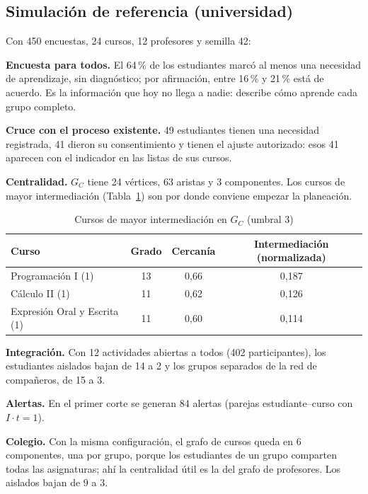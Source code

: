 \documentclass[12pt,letterpaper]{article}
\begin{document}
\subsection{Simulación de referencia (universidad)}
Con 450 encuestas, 24 cursos, 12 profesores y semilla 42:

\textbf{Encuesta para todos.} El 64\,\% de los estudiantes marcó al menos una necesidad de aprendizaje, sin diagnóstico; por afirmación, entre 16\,\% y 21\,\% está de acuerdo. Es la información que hoy no llega a nadie: describe cómo aprende cada grupo completo.

\textbf{Cruce con el proceso existente.} 49 estudiantes tienen una necesidad registrada, 41 dieron su consentimiento y tienen el ajuste autorizado: esos 41 aparecen con el indicador en las listas de sus cursos.

\textbf{Centralidad.} $G_C$ tiene 24 vértices, 63 aristas y 3 componentes. Los cursos de mayor intermediación (Tabla~\ref{tab:central}) son por donde conviene empezar la planeación.

\begin{table}[H]
\centering
\caption{Cursos de mayor intermediación en $G_C$ (umbral 3)}
\label{tab:central}
\small
\begin{tabular}{lccc}
\toprule
Curso & Grado & Cercanía & Intermediación (normalizada) \\
\midrule
Programación I (1) & 13 & 0,66 & 0,187 \\
Cálculo II (1) & 11 & 0,62 & 0,126 \\
Expresión Oral y Escrita (1) & 11 & 0,60 & 0,114 \\
\bottomrule
\end{tabular}
\end{table}

\textbf{Integración.} Con 12 actividades abiertas a todos (402 participantes), los estudiantes aislados bajan de 14 a 2 y los grupos separados de la red de compañeros, de 15 a 3.

\textbf{Alertas.} En el primer corte se generan 84 alertas (parejas estudiante--curso con $I\cdot t=1$).

\textbf{Colegio.} Con la misma configuración, el grafo de cursos queda en 6 componentes, una por grupo, porque los estudiantes de un grupo comparten todas las asignaturas; ahí la centralidad útil es la del grafo de profesores. Los aislados bajan de 9 a 3.
\end{document}
